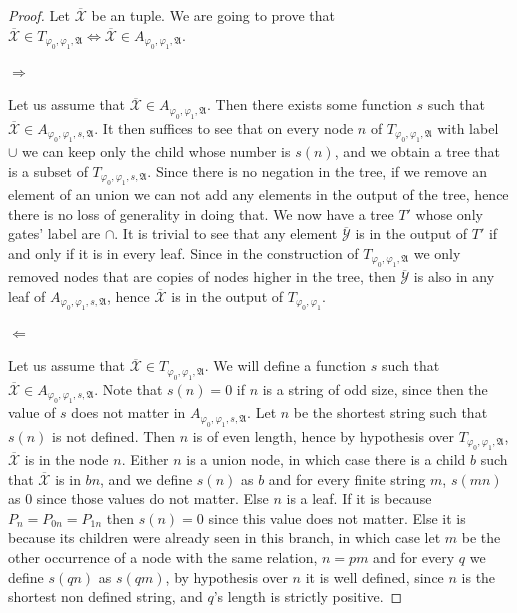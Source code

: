 \documentclass[a4paper,12pt]{article}
\theoremstyle{definition}
\renewcommand{\phi}{\varphi}
\newcommand{\mf}{\mathfrak}
\newcommand{\olmc}[1]{\overline{\mathcal{#1}}}
\begin{document}
\begin{proof}
  Let $\olmc X$ be an tuple. We are going to prove that $\olmc X\in
  T_{\phi_{0},\phi_{1},\mf A}\Leftrightarrow\olmc X\in A_{\phi_{0},\phi_{1},\mf A}$.

  \paragraph{$\Rightarrow$} Let us assume that $\olmc X\in
  A_{\phi_{0},\phi_{1},\mf A}$. Then there exists some function $s$ such that
  $\olmc X\in A_{\phi_{0},\phi_{1},s,\mf A}$. It then suffices to see that on
  every node $n$ of $T_{\phi_{0},\phi_{1},\mf A}$ with label $\cup$ we can
  keep only the child whose number is $s(n)$, and we obtain a tree
  that is a subset of $T_{\phi_{0},\phi_{1},s,\mf A}$. Since there is no
  negation in the tree, if we remove an element of an union we can not
  add any elements in the output of the tree, hence there is no loss
  of generality in doing that. We now have a tree $T'$ whose only
  gates' label are $\cap$.  It is trivial to see that any element
  $\olmc Y$ is in the output of $T'$ if and only if it is in every
  leaf. Since in the construction of $T_{\phi_{0},\phi_{1},\mf A}$ we only
  removed nodes that are copies of nodes higher in the tree, then
  $\olmc Y$ is also in any leaf of $A_{\phi_{0},\phi_{1},s,\mf A}$, hence
  $\olmc X$ is in the output of $T_{\phi_{0},\phi_{1}}$.

  \paragraph{$\Leftarrow$} Let us assume that $\olmc X\in
  T_{\phi_{0},\phi_{1},\mf A}$. We will define a function $s$ such that $\olmc
  X\in A_{\phi_{0},\phi_{1},s,\mf A}$. Note that $s(n)=0$ if $n$ is a string
  of odd size, since then the value of $s$ does not matter in
  $A_{\phi_{0},\phi_{1},s,\mf A}$. Let $n$ be the shortest string such that
  $s(n)$ is not defined. Then $n$ is of even length, hence by
  hypothesis over $T_{\phi_{0},\phi_{1},\mf A}$, $\olmc X$ is in the node $n$.
  Either $n$ is a union node, in which case there is a child $b$ such
  that $\olmc X$ is in $bn$, and we define $s(n)$ as $b$ and for every
  finite string $m$, $s(mn)$ as $0$ since those values do not
  matter. Else $n$ is a leaf. If it is because $P_{n}=P_{0n}=P_{1n}$
  then $s(n)=0$ since this value does not matter. Else it is because
  its children were already seen in this branch, in which case let $m$ be the
  other occurrence of a node with the same relation, $n=pm$ and for
  every $q$ we define $s(qn)$ as $s(qm)$, by hypothesis over $n$ it is
  well defined, since $n$ is the shortest non defined string, and
  $q$'s length is strictly positive.
\end{proof}
\end{document}

